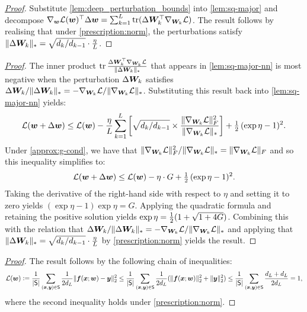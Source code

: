 \majordnn*
\begin{proof}[\mbox{\hyperref[lem:sq-major-nn]{Proof}}]\label{proof:majordnn}
Substitute \cref{lem:deep_perturbation_bounds} into \cref{lem:sq-major} and decompose $\nabla_{\bm{w}}\mathcal{L}({\bm{w}})^\top \Delta {\bm{w}} = \sum_{k=1}^L \operatorname{tr} (\Delta {\bm{W}}_k^\top \nabla_{{\bm{W}}_k}\mathcal{L})$. The result follows by realising that under \cref{prescription:norm}, the perturbations satisfy $\Vert {\Delta {\bm{W}}_k} \Vert_* = \sqrt{d_k/d_{k-1}} \cdot \frac{\eta}{L}$.
\end{proof}

\loglr*
\begin{proof}[\mbox{\hyperref[thm:log-lr]{Proof}}]\label{proof:loglr} The inner product $\operatorname{tr}\frac{\Delta {\bm{W}}_k^\top\nabla_{{\bm{W}}_k}\mathcal{L}}{\Vert {\Delta {\bm{W}}_k} \Vert_*}$ that appears in \cref{lem:sq-major-nn} is most negative when the perturbation $\Delta {\bm{W}}_k$ satisfies $\Delta {\bm{W}}_k/\Vert {\Delta {\bm{W}}_k} \Vert_* = - \nabla_{{\bm{W}}_k}\mathcal{L} / \Vert {\nabla_{{\bm{W}}_k}\mathcal{L}} \Vert_*$. Substituting this result back into \cref{lem:sq-major-nn} yields:
\begin{equation*}
        \mathcal{L}({\bm{w}}+\Delta {\bm{w}}) \leq \mathcal{L}({\bm{w}}) - \frac{\eta}{L}\sum_{k=1}^L\left[\sqrt{d_k/d_{k-1}} \times\frac{\Vert {\nabla_{{\bm{W}}_k}\mathcal{L}} \Vert_F^2}{\Vert {\nabla_{{\bm{W}}_k}\mathcal{L}} \Vert_*}\right] + \tfrac{1}{2} \,(\exp \eta -1)^2.
\end{equation*}
Under \cref{approx:g-cond}, we have that $\Vert {\nabla_{{\bm{W}}_k}\mathcal{L}} \Vert_F^2/\Vert {\nabla_{{\bm{W}}_k}\mathcal{L}} \Vert_* = \Vert {\nabla_{{\bm{W}}_k}\mathcal{L}} \Vert_F$ and so this inequality simplifies to:
\begin{equation*}
        \mathcal{L}({\bm{w}}+\Delta {\bm{w}}) \leq \mathcal{L}({\bm{w}}) - \eta\cdot G + \tfrac{1}{2} \,(\exp \eta -1)^2.
\end{equation*}
Taking the derivative of the right-hand side with respect to $\eta$ and setting it to zero yields $(\exp\eta-1)\exp\eta = G$. Applying the quadratic formula and retaining the positive solution yields $\exp \eta = \tfrac{1}{2}(1+\sqrt{1+4G})$. Combining this with the relation that $\Delta {\bm{W}}_k/\Vert {\Delta {\bm{W}}_k} \Vert_* = - \nabla_{{\bm{W}}_k}\mathcal{L} / \Vert {\nabla_{{\bm{W}}_k}\mathcal{L}} \Vert_*$ and applying that $\Vert {\Delta {\bm{W}}_k} \Vert_* = \sqrt{d_k/d_{k-1}} \cdot \frac{\eta}{L}$ by \cref{prescription:norm} yields the result.
\end{proof}

\objectivebound*
\begin{proof}[\mbox{\hyperref[lem:objectivebound]{Proof}}]\label{proof:objectivebound}
The result follows by the following chain of inequalities:
\begin{align*}
    \mathcal{L}({\bm{w}}) \vcentcolon= \frac{1}{\vert {\mathsf{S}} \vert} \sum_{({\bm{x}},{\bm{y}})\in \mathsf{S}}\frac{1}{2d_L}\Vert {{\bm{f}}({\bm{x}};{\bm{w}}) - {\bm{y}}} \Vert_2^2 \leq \frac{1}{\vert {\mathsf{S}} \vert} \sum_{({\bm{x}},{\bm{y}})\in \mathsf{S}}\frac{1}{2d_L}(\Vert {{\bm{f}}({\bm{x}};{\bm{w}})} \Vert_2^2 +\Vert {{\bm{y}}} \Vert_2^2) \leq \frac{1}{\vert {\mathsf{S}} \vert} \sum_{({\bm{x}},{\bm{y}})\in \mathsf{S}}\frac{d_L+d_L}{2d_L} = 1,
\end{align*}
where the second inequality holds under \cref{prescription:norm}.
\end{proof}

